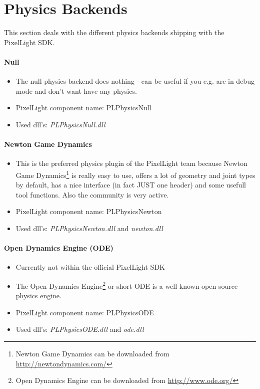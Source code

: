 \section{Physics Backends}
This section deals with the different physics backends shipping with the PixelLight SDK.


\paragraph{Null}
\begin{itemize}
\item The null physics backend does nothing - can be useful if you e.g. are in debug mode and don't want have any physics.
\item PixelLight component name: PLPhysicsNull
\item Used dll's: \emph{PLPhysicsNull.dll}
\end{itemize}


\paragraph{Newton Game Dynamics}
\begin{itemize}
\item This is the preferred physics plugin of the PixelLight team because Newton Game Dynamics\footnote{Newton Game Dynamics can be downloaded from \url{http://newtondynamics.com/}} is really easy to use, offers a lot of geometry and joint types by default, has a nice interface (in fact JUST one header) and some usefull tool functions. Also the community is very active.
\item PixelLight component name: PLPhysicsNewton
\item Used dll's: \emph{PLPhysicsNewton.dll} and \emph{newton.dll}
\end{itemize}


\paragraph{Open Dynamics Engine (ODE)}
\begin{itemize}
\item Currently not within the official PixelLight SDK
\item The Open Dynamics Engine\footnote{Open Dynamics Engine can be downloaded from \url{http://www.ode.org/}} or short ODE is a well-known open source physics engine.
\item PixelLight component name: PLPhysicsODE
\item Used dll's: \emph{PLPhysicsODE.dll} and \emph{ode.dll}
\end{itemize}


